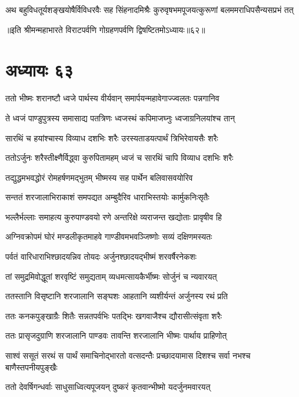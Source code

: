 \twolineshloka
{अथ बहुविधतूर्यशङ्खयोषैर्विविधरवैः सह सिंहनादमिश्रैः}
{कुरुवृषभमपूजयत्कुरूणां बलममराधिपसैन्यसप्रभं तत्}

॥इति श्रीमन्महाभारते विराटपर्वणि गोग्रहणपर्वणि द्विषष्टितमोऽध्यायः॥६२॥

\chapter{अध्यायः ६३}

\twolineshloka
{ततो भीष्मः शरानष्टौ ध्वजे पार्थस्य वीर्यवान्}
{समार्पयन्महावेगाज्ज्वलतः पन्नगानिव}


\twolineshloka
{ते ध्वजं पाण्डुपुत्रस्य समासाद्य पतत्रिणः}
{ध्वजस्थं कपिमाजघ्नुः ध्वजाग्रनिलयांश्च तान्}


\twolineshloka
{सारथिं च हयांश्चास्य विव्याध दशभिः शरैः}
{उरस्यताडयत्पार्थं त्रिभिरेवायसैः शरैः}


\twolineshloka
{ततोऽर्जुनः शरैस्तीक्ष्णैर्विद्ध्वा कुरुपितामहम्}
{ध्वजं च सारथिं चापि विव्याध दशभिः शरैः}


\twolineshloka
{तद्युद्धमभवद्धोरं रोमहर्षणमद्भुतम्}
{भीष्मस्य सह पार्थेन बलिवासवयोरिव}


\twolineshloka
{सन्ततं शरजालाभिराकाशं समपद्यत}
{अम्बुदैरिव धाराभिस्तयोः कार्मुकनिःसृतैः}


\twolineshloka
{भल्लैर्भल्लाः समाहत्य कुरुपाण्डवयो रणे}
{अन्तरिक्षे व्यराजन्त खद्योताः प्रावृषीव हि}


\twolineshloka
{अग्निवक्रोपमं घोरं मण्डलीकृतमाहवे}
{गाण्डीवमभवञ्जिष्णोः सव्यं दक्षिणमस्यतः}


\twolineshloka
{पर्वतं वारिधाराभिश्छादयन्निव तोयदः}
{अर्जुनश्छादयद्भीष्मं शरवर्षैरनेकशः}


\twolineshloka
{तां समुद्रमिवोद्धूतां शरवृष्टिं समुद्यताम्}
{व्यधमत्सायकैर्भीष्मः सोर्जुनं च न्यवारयत्}


\twolineshloka
{ततस्तानि विसृष्टानि शरजालानि सङ्घशः}
{आहतानि व्यशीर्यन्तं अर्जुनस्य रथं प्रति}


\twolineshloka
{ततः कनकपुङ्खाग्रैः शितैः सन्नतपर्वभिः}
{पतद्भिः खगवाजैश्च द्यौरासीत्संवृता शरैः}


\twolineshloka
{ततः प्रासृजदुग्राणि शरजालानि पाण्डवः}
{तावन्ति शरजालानि भीष्मः पार्थाय प्राहिणोत्}


\twolineshloka
{साश्वं ससूतं सरथं स पार्थं समाचिनोद्भारतो वत्सदन्तैः}
{प्रच्छादयामास दिशश्च सर्वा नभश्च बाणैस्तपनीयपुङ्खैः}


\twolineshloka
{ततो देवर्षिगन्धर्वाः साधुसाध्वित्यपूजयन्}
{दुष्करं कृतवान्भीष्मो यदर्जुनमवारयत्}


